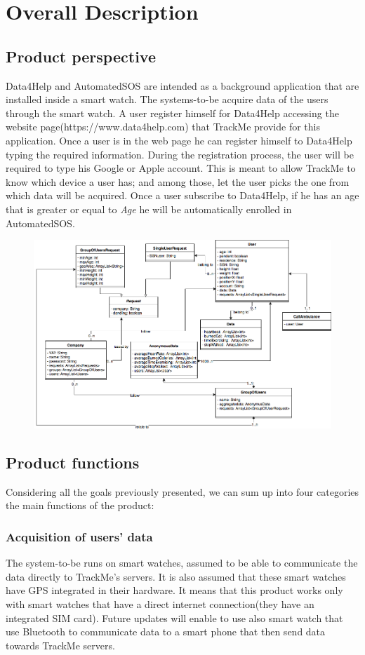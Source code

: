 \documentclass{article}
\begin{document}
\section{Overall Description}
\subsection{Product perspective}
Data4Help and AutomatedSOS are intended as a background application that are installed inside a smart watch. The systems-to-be acquire data of the users through the smart watch. A user register himself for Data4Help accessing the website page(https://www.data4help.com) that TrackMe provide for this application. Once a user is in the web page he can register himself to Data4Help typing the required information. During the registration process, the user will be required to type his Google or Apple account. This is meant to allow TrackMe to know which device a user has; and among those, let the user picks the one from which data will be acquired. Once a user subscribe to Data4Help, if he has an age that is greater or equal to \emph{Age} he will be automatically enrolled in AutomatedSOS.
\begin{figure}[h!]
\centering
    \textbf{}\par\medskip
	\includegraphics[width= \linewidth]{model.png}
\end{figure}
\subsection{Product functions}
Considering all the goals previously presented, we can sum up into four categories the main functions of the product: \newpage
\subsubsection{Acquisition of users' data}
The system-to-be runs on smart watches, assumed to be able to communicate the data directly to TrackMe's servers. It is also assumed that these smart watches have GPS integrated in their hardware. It means that this product works only with smart watches that have a direct internet connection(they have an integrated SIM card). Future updates will enable to use also smart watch that use Bluetooth to communicate data to a smart phone that then send data towards TrackMe servers.
\end{document}
